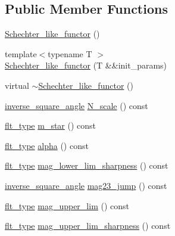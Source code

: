 \subsection*{Public Member Functions}
\begin{DoxyCompactItemize}
\item 
\hyperlink{classIceBRG_1_1Schechter__like__functor_a98942cf327953bc6de8cdd53fde65ef7}{Schechter\+\_\+like\+\_\+functor} ()
\item 
{\footnotesize template$<$typename T $>$ }\\\hyperlink{classIceBRG_1_1Schechter__like__functor_a351e38eaf242da441ca220369def0bc6}{Schechter\+\_\+like\+\_\+functor} (T \&\&init\+\_\+params)
\item 
virtual \hyperlink{classIceBRG_1_1Schechter__like__functor_aaf1a25297a4e050deab517c7e1edebfb}{$\sim$\+Schechter\+\_\+like\+\_\+functor} ()
\item 
\hyperlink{namespaceIceBRG_a26efaff9c9adf346c7d09d0b714731f6}{inverse\+\_\+square\+\_\+angle} \hyperlink{classIceBRG_1_1Schechter__like__functor_a1c867a8a96d360d3b1da7c122f9f96a3}{N\+\_\+scale} () const 
\item 
\hyperlink{lib_2IceBRG__main_2common_8h_ad0f130a56eeb944d9ef2692ee881ecc4}{flt\+\_\+type} \hyperlink{classIceBRG_1_1Schechter__like__functor_a80a81ec7dcad32167672eec726bbca00}{m\+\_\+star} () const 
\item 
\hyperlink{lib_2IceBRG__main_2common_8h_ad0f130a56eeb944d9ef2692ee881ecc4}{flt\+\_\+type} \hyperlink{classIceBRG_1_1Schechter__like__functor_afb0660168ea5cc0462369c0559a4654c}{alpha} () const 
\item 
\hyperlink{lib_2IceBRG__main_2common_8h_ad0f130a56eeb944d9ef2692ee881ecc4}{flt\+\_\+type} \hyperlink{classIceBRG_1_1Schechter__like__functor_a36c03d8a6b0bacc3f6fbc60cf828ca7a}{mag\+\_\+lower\+\_\+lim\+\_\+sharpness} () const 
\item 
\hyperlink{namespaceIceBRG_a26efaff9c9adf346c7d09d0b714731f6}{inverse\+\_\+square\+\_\+angle} \hyperlink{classIceBRG_1_1Schechter__like__functor_a5ec784331b2eeb1a1d6077e6cc691e82}{mag23\+\_\+jump} () const 
\item 
\hyperlink{lib_2IceBRG__main_2common_8h_ad0f130a56eeb944d9ef2692ee881ecc4}{flt\+\_\+type} \hyperlink{classIceBRG_1_1Schechter__like__functor_ad51153efefe230a196400a72f6b98510}{mag\+\_\+upper\+\_\+lim} () const 
\item 
\hyperlink{lib_2IceBRG__main_2common_8h_ad0f130a56eeb944d9ef2692ee881ecc4}{flt\+\_\+type} \hyperlink{classIceBRG_1_1Schechter__like__functor_a977c88ecf83ce6116b33698d80d7b99a}{mag\+\_\+upper\+\_\+lim\+\_\+sharpness} () const 

\end{DoxyCompactItemize}
